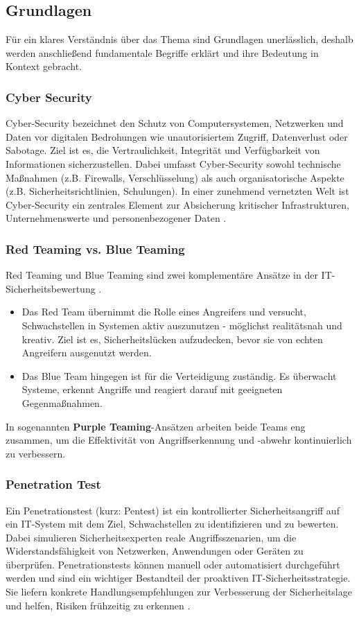 \subsection{Grundlagen}
Für ein klares Verständnis über das Thema sind Grundlagen unerlässlich, deshalb werden anschließend fundamentale Begriffe erklärt und ihre Bedeutung in Kontext gebracht.  
\subsubsection{Cyber Security}
Cyber-Security bezeichnet den Schutz von Computersystemen, Netzwerken und Daten vor digitalen Bedrohungen wie unautorisiertem Zugriff, Datenverlust oder Sabotage. Ziel ist es, die Vertraulichkeit, Integrität und Verfügbarkeit von Informationen sicherzustellen. Dabei umfasst Cyber-Security sowohl technische Maßnahmen (z.B. Firewalls, Verschlüsselung) als auch organisatorische Aspekte (z.B. Sicherheitsrichtlinien, Schulungen). In einer zunehmend vernetzten Welt ist Cyber-Security ein zentrales Element zur Absicherung kritischer Infrastrukturen, Unternehmenswerte und personenbezogener Daten \cite{nist800115}.
\subsubsection{Red Teaming vs. Blue Teaming}
Red Teaming und Blue Teaming sind zwei komplementäre Ansätze in der IT-Sicherheitsbewertung \cite{crowdstrike_redblue}.
\begin{itemize}
\item Das Red Team übernimmt die Rolle eines Angreifers und versucht, Schwachstellen in Systemen aktiv auszunutzen - möglichst realitätsnah und kreativ. Ziel ist es, Sicherheitslücken aufzudecken, bevor sie von echten Angreifern ausgenutzt werden.
\item Das Blue Team hingegen ist für die Verteidigung zuständig. Es überwacht Systeme, erkennt Angriffe und reagiert darauf mit geeigneten Gegenmaßnahmen.
\end{itemize}
In sogenannten \textbf{Purple Teaming}-Ansätzen arbeiten beide Teams eng zusammen, um die Effektivität von Angriffserkennung und -abwehr kontinuierlich zu verbessern.
\subsubsection{Penetration Test}
Ein Penetrationstest (kurz: Pentest) ist ein kontrollierter Sicherheitsangriff auf ein IT-System mit dem Ziel, Schwachstellen zu identifizieren und zu bewerten. Dabei simulieren Sicherheitsexperten reale Angriffsszenarien, um die Widerstandsfähigkeit von Netzwerken, Anwendungen oder Geräten zu überprüfen. Penetrationstests können manuell oder automatisiert durchgeführt werden und sind ein wichtiger Bestandteil der proaktiven IT-Sicherheitsstrategie. Sie liefern konkrete Handlungsempfehlungen zur Verbesserung der Sicherheitslage und helfen, Risiken frühzeitig zu erkennen \cite{nist800115}.
